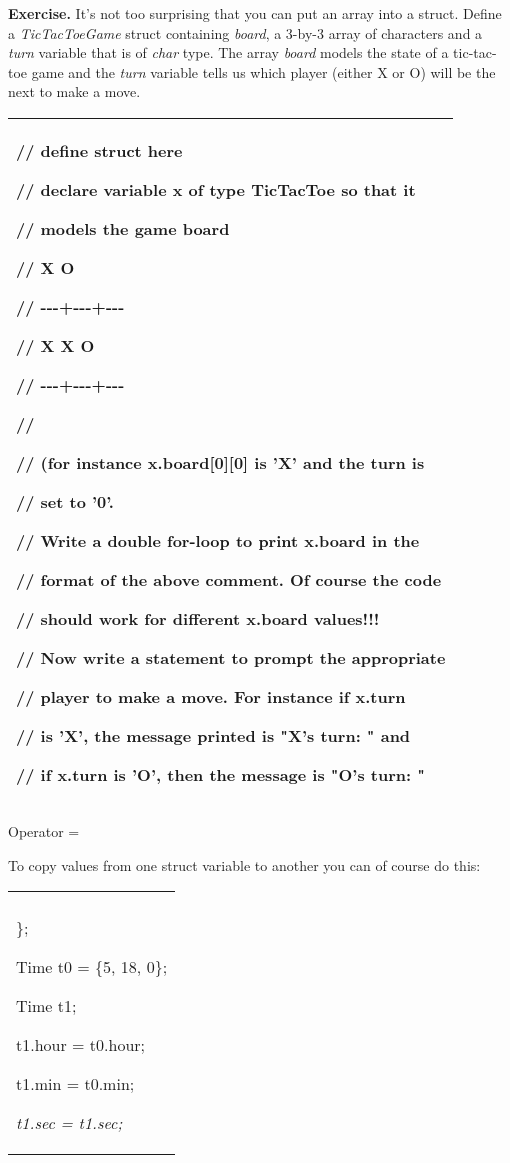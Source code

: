 \documentclass[
]{article}
\begin{document}
\textbf{Exercise.} It's not too surprising that you can put an array
into a struct. Define a \emph{TicTacToeGame} struct containing
\emph{board}, a 3-by-3 array of characters and a \emph{turn} variable
that is of \emph{char} type. The array \emph{board} models the state of
a tic-tac-toe game and the \emph{turn} variable tells us which player
(either X or O) will be the next to make a move.

\begin{longtable}[]{@{}l@{}}
\toprule
\endhead
\begin{minipage}[t]{0.97\columnwidth}\raggedright
// define struct here

// declare variable x of type TicTacToe so that it

// models the game board

// X \textbar{} \textbar{} O

// -\/-\/-+-\/-\/-+-\/-\/-

// X \textbar{} X \textbar{} O

// -\/-\/-+-\/-\/-+-\/-\/-

// \textbar{} \textbar{}

// (for instance x.board{[}0{]}{[}0{]} is 'X' and the turn is

// set to '0'.

// Write a double for-loop to print x.board in the

// format of the above comment. Of course the code

// should work for different x.board values!!!

// Now write a statement to prompt the appropriate

// player to make a move. For instance if x.turn

// is 'X', the message printed is "X's turn: " and

// if x.turn is 'O', then the message is "O's turn: "\strut
\end{minipage}\tabularnewline
\bottomrule
\end{longtable}

Operator =

To copy values from one struct variable to another you can of course do
this:

\begin{longtable}[]{@{}l@{}}
\toprule
\endhead
\begin{minipage}[t]{0.97\columnwidth}\raggedright
struct Time

\{

int hour, min, sec;\\
\};

Time t0 = \{5, 18, 0\};

Time t1;

t1.hour = t0.hour;

t1.min = t0.min;

\emph{t1.sec = t1.sec;} \strut
\end{minipage}\tabularnewline
\bottomrule
\end{longtable}
\end{document}
